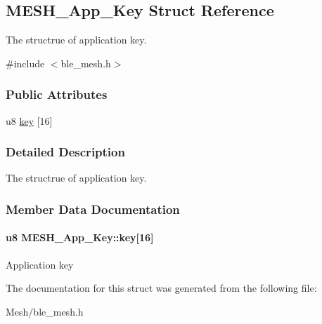 \hypertarget{struct_m_e_s_h___app___key}{}\subsection{M\+E\+S\+H\+\_\+\+App\+\_\+\+Key Struct Reference}
\label{struct_m_e_s_h___app___key}


The structrue of application key.  




{\ttfamily \#include $<$ble\+\_\+mesh.\+h$>$}

\subsubsection*{Public Attributes}
\begin{DoxyCompactItemize}
\item 
u8 \hyperlink{struct_m_e_s_h___app___key_a98cf7b5c6c73704c708aaf20163c041b}{key} \mbox{[}16\mbox{]}
\end{DoxyCompactItemize}


\subsubsection{Detailed Description}
The structrue of application key. 

\subsubsection{Member Data Documentation}
\paragraph[{\texorpdfstring{key}{key}}]{\setlength{\rightskip}{0pt plus 5cm}u8 M\+E\+S\+H\+\_\+\+App\+\_\+\+Key\+::key\mbox{[}16\mbox{]}}\hypertarget{struct_m_e_s_h___app___key_a98cf7b5c6c73704c708aaf20163c041b}{}\label{struct_m_e_s_h___app___key_a98cf7b5c6c73704c708aaf20163c041b}
Application key 

The documentation for this struct was generated from the following file\+:\begin{DoxyCompactItemize}
\item 
Mesh/ble\+\_\+mesh.\+h\end{DoxyCompactItemize}
